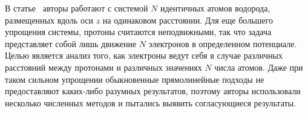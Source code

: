 \documentclass[a4paper, 14pt]{extarticle}
\begin{document}

В статье~\cite{three} авторы работают с системой $N$ идентичных атомов 
водорода, размещенных вдоль оси $z$ на одинаковом расстоянии. Для еще 
большего упрощения системы, протоны считаются неподвижными, так что 
задача представляет собой лишь движение $N$ электронов в определенном 
потенциале. Целью является анализ того, как электроны ведут себя 
в случае различных расстояний между протонами и различных значениях $N$ 
числа атомов. Даже при таком сильном упрощении обыкновенные 
прямолинейные подходы не предоставляют каких-либо разумных результатов, 
поэтому авторы использовали несколько численных методов и пытались 
выявить согласующиеся результаты.


\end{document}
